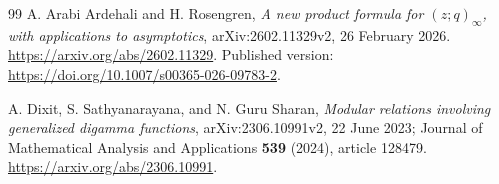 \documentclass[11pt,letterpaper]{article}
\numberwithin{equation}{section}
\theoremstyle{definition}
\theoremstyle{remark}
\begin{document}
\begin{thebibliography}{99}
A. Arabi Ardehali and H. Rosengren,
\emph{A new product formula for \((z;q)_\infty\),
with applications to asymptotics},
arXiv:2602.11329v2, 26 February 2026.
\url{https://arxiv.org/abs/2602.11329}.
Published version:
\url{https://doi.org/10.1007/s00365-026-09783-2}.

A. Dixit, S. Sathyanarayana, and N. Guru Sharan,
\emph{Modular relations involving generalized digamma functions},
arXiv:2306.10991v2, 22 June 2023;
Journal of Mathematical Analysis and Applications
\textbf{539} (2024), article 128479.
\url{https://arxiv.org/abs/2306.10991}.



\end{thebibliography}
\end{document}
